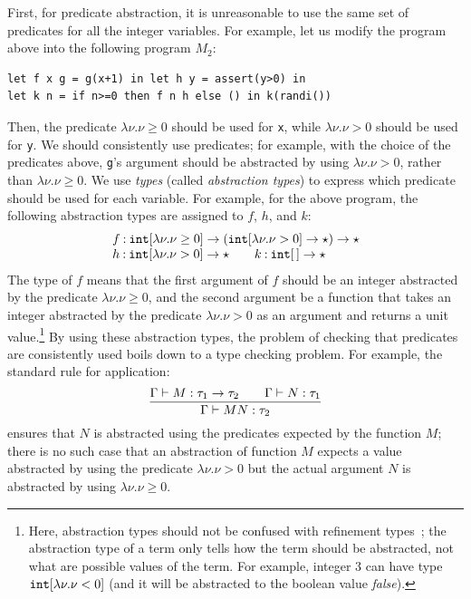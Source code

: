 First, for predicate abstraction, it is unreasonable to use the same set 
of predicates for all the integer variables. For example, let us modify 
the program above into the following program \(M_2\):
\begin{verbatim}
let f x g = g(x+1) in let h y = assert(y>0) in
let k n = if n>=0 then f n h else () in k(randi())
\end{verbatim}
Then, the predicate \(\lambda \nu.\nu\geq 0\) should be used for 
\texttt{x}, while \(\lambda \nu.\nu>0\) should be used for \texttt{y}. 
We should consistently use predicates; for example, with the choice of 
the predicates above, \verb|g|'s argument should be abstracted by using 
\(\lambda \nu.\nu>0\), rather than \(\lambda \nu.\nu\geq 0\). We use 
\emph{types} (called \emph{abstraction types}) to express which 
predicate should be used for each variable. For example, for the above 
program, the following abstraction types are assigned to \(f\), \(h\), 
and \(k\):
\[
\begin{array}{l}
f\mathbin{:} \mathtt{int}[\lambda \nu.\nu\geq 0] \rightarrow (\mathtt{int}[\lambda \nu.\nu> 0] \rightarrow \star) \rightarrow \star\\
h \mathbin{:} \mathtt{int}[\lambda \nu.\nu> 0] \rightarrow \star\qquad
k\mathbin{:} \mathtt{int}[\,]\rightarrow\star
\end{array}
\]
The type of \(f\) means that the first argument of \(f\) should be an 
integer abstracted by the predicate \(\lambda \nu.\nu\geq 0\), and the 
second argument be a function that takes an integer abstracted by the 
predicate \(\lambda \nu.\nu>0\) as an argument and returns a unit 
value.\footnote{Here, abstraction types should not be confused with 
refinement types~\cite{Xi1999}; the abstraction type of a term only 
tells how the term should be abstracted, not what are possible values of 
the term. For example, integer \(3\) can have type \(\texttt{int}[\lambda 
\nu.\nu<0]\) (and it will be abstracted to the boolean value 
\textit{false}).} By using these abstraction types, the problem of 
checking that predicates are consistently used boils down to a type 
checking problem. For example, the standard rule for application:
\[
\frac{\Gamma \vdash M: \tau_1 \rightarrow \tau_2\quad\quad \Gamma\vdash N:\tau_1}
{\Gamma\vdash M N: \tau_2}
\]
ensures that \(N\) is abstracted using the predicates expected by the 
function \(M\); there is no such case that an abstraction of function 
\(M\) expects a value abstracted by using the predicate \(\lambda 
\nu.\nu>0\) but the actual argument \(N\) is abstracted by using 
\(\lambda \nu.\nu\geq0\).

